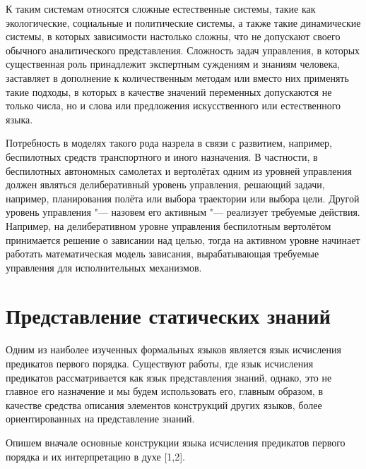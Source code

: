 \documentclass[b5paper,11pt]{book}
\begin{document}
	К таким системам относятся сложные естественные системы, такие как экологические, социальные и политические системы, а также такие динамические системы, в которых зависимости настолько сложны, что не допускают своего обычного аналитического представления. Сложность задач управления, в которых существенная роль принадлежит экспертным суждениям и знаниям человека, заставляет в дополнение к количественным методам или вместо них применять такие подходы, в которых в качестве значений переменных допускаются не только числа, но и слова или предложения искусственного или естественного языка. 
	
	Потребность в моделях такого рода назрела в связи с развитием, например, беспилотных средств транспортного и иного назначения. В частности, в беспилотных автономных самолетах и вертолётах одним из уровней управления должен являться делиберативный уровень управления, решающий задачи, например, планирования полёта или выбора траектории или выбора цели. Другой уровень управления "--- назовем его активным "--- реализует требуемые действия. Например, на  делиберативном уровне управления беспилотным вертолётом принимается решение о зависании над целью, тогда на активном уровне начинает работать математическая модель зависания, вырабатывающая требуемые управления для исполнительных механизмов.
	
	\chapter{Представление статических знаний}
	Одним из наиболее изученных формальных языков является язык исчисления предикатов первого порядка. Существуют работы, где язык исчисления предикатов рассматривается как язык представления знаний, однако, это не главное его назначение и мы будем использовать его, главным образом, в качестве средства описания элементов конструкций других языков, более ориентированных на представление знаний. 
	
	Опишем вначале основные конструкции языка исчисления предикатов первого порядка и их интерпретацию в духе [1,2].
	
\end{document}
